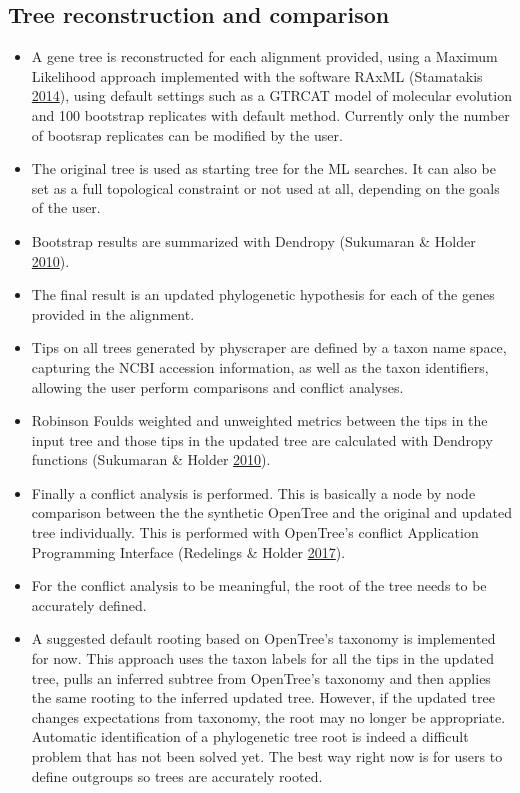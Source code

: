 \documentclass[]{article}
\providecommand{\tightlist}{%
  \setlength{\itemsep}{0pt}\setlength{\parskip}{0pt}}
\begin{document}
\hypertarget{tree-reconstruction-and-comparison}{%
\subsection{Tree reconstruction and comparison}\label{tree-reconstruction-and-comparison}}

\begin{itemize}
\tightlist
\item
  A gene tree is reconstructed for each alignment provided, using a Maximum Likelihood approach implemented with the software RAxML (Stamatakis \protect\hyperlink{ref-stamatakis2014raxml}{2014}), using default settings such as a GTRCAT model of molecular evolution and 100 bootstrap replicates with default method. Currently only the number of bootsrap replicates can be modified by the user.
\item
  The original tree is used as starting tree for the ML searches. It can also be set as a full topological constraint or not used at all, depending on the goals of the user.
\item
  Bootstrap results are summarized with Dendropy (Sukumaran \& Holder \protect\hyperlink{ref-sukumaran2010dendropy}{2010}).
\item
  The final result is an updated phylogenetic hypothesis for each of the genes provided in the alignment.
\item
  Tips on all trees generated by physcraper are defined by a taxon name space, capturing the NCBI accession information, as well as the taxon identifiers, allowing the user perform comparisons and conflict analyses.
\item
  Robinson Foulds weighted and unweighted metrics between the tips in the input tree and those tips in the updated tree are calculated with Dendropy functions (Sukumaran \& Holder \protect\hyperlink{ref-sukumaran2010dendropy}{2010}).
\item
  Finally a conflict analysis is performed. This is basically a node by node comparison between the the synthetic OpenTree and the original and updated tree individually. This is performed with OpenTree's conflict Application Programming Interface (Redelings \& Holder \protect\hyperlink{ref-redelings2017supertree}{2017}).
\item
  For the conflict analysis to be meaningful, the root of the tree needs to be accurately defined.
\item
  A suggested default rooting based on OpenTree's taxonomy is implemented for now. This approach uses the taxon labels for all the tips in the updated tree, pulls an inferred subtree from OpenTree's taxonomy and then applies the same rooting to the inferred updated tree. However, if the updated tree changes expectations from taxonomy, the root may no longer be appropriate. Automatic identification of a phylogenetic tree root is indeed a difficult problem that has not been solved yet. The best way right now is for users to define outgroups so trees are accurately rooted.
\end{itemize}
\end{document}
